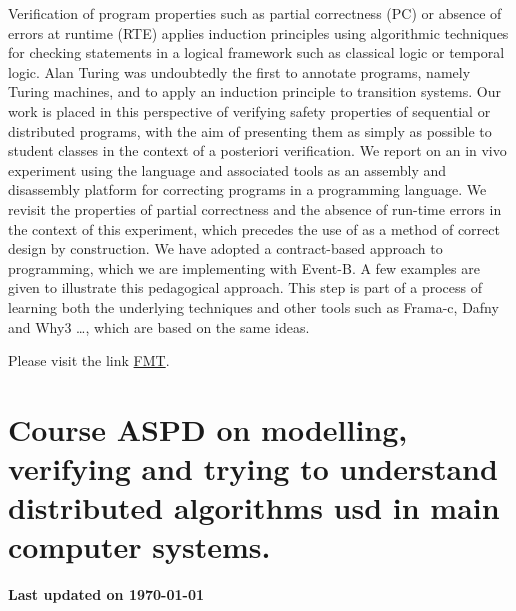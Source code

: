 \documentclass[ 12pt]{article}
\begin{document}
Verification of program properties such as partial correctness (PC) or absence of errors at runtime (RTE) applies induction principles using algorithmic techniques for checking statements in a logical framework such as classical logic or temporal logic.  Alan Turing was undoubtedly the first to annotate programs, namely Turing machines, and to apply an induction principle to transition systems.  Our work is placed in this perspective of verifying safety properties of sequential or distributed programs, with the aim of presenting them as simply as possible to student classes in the context of a posteriori verification.  We report on an in vivo experiment using the \eb language and associated tools as an assembly and disassembly platform for correcting programs in a programming language.  We revisit the properties of partial correctness and the absence of run-time errors in the context of this experiment, which precedes the use of \eb as a method of correct design by construction.  We have adopted a contract-based approach to programming, which we are implementing with Event-B.  A few examples are given to illustrate this pedagogical approach.  This step is part of a process of learning both the underlying techniques and other tools such as Frama-c, Dafny and Why3 \ldots, which are based on the same ideas.

Please visit the link \href{https://mery54.github.io/fmt}{FMT}.

\section{Course ASPD on modelling, verifying and trying to understand distributed algorithms usd in  main  computer systems. }




\textbf{{Last updated \now on \today}}
\end{document}
